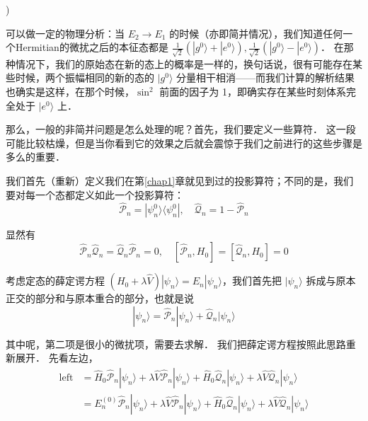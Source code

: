 )

可以做一定的物理分析：当 $E_2\to E_1$ 的时候（亦即简并情况），我们知道任何一个Hermitian的微扰之后的本征态都是 $\frac{1}{\sqrt{2}}(|g^0\rangle + |e^0\rangle),\frac{1}{\sqrt{2}}(|g^0\rangle - |e^0\rangle)$． 在那种情况下，我们的原始态在新的态上的概率是一样的，换句话说，很有可能存在某些时候，两个振幅相同的新的态的 $|g^0\rangle$ 分量相干相消——而我们计算的解析结果也确实是这样，在那个时候，$\sin^2$ 前面的因子为 1，即确实存在某些时刻体系完全处于 $|e^0\rangle$ 上．


那么，一般的非简并问题是怎么处理的呢？首先，我们要定义一些算符． 这一段可能比较枯燥，但是当你看到它的效果之后就会震惊于我们之前进行的这些步骤是多么的重要．

我们首先（重新）定义我们在第\ref{chap1}章就见到过的投影算符；不同的是，我们要对每一个态都定义如此一个投影算符：
\begin{equation}
\hat{\mathcal{P}}_n = |\psi^0_n\rangle\langle\psi^0_n|,\quad \hat{\mathcal{Q}}_n = 1-\hat{\mathcal{P}}_n 
\end{equation}

显然有
\begin{equation}
\hat{\mathcal{P}}_n \hat{\mathcal{Q}}_n = \hat{\mathcal{Q}}_n \hat{\mathcal{P}}_n =0,\quad [\hat{\mathcal{P}}_n ,H_0] = [\hat{\mathcal{Q}}_n ,H_0] = 0
\end{equation}

考虑定态的薛定谔方程 $(H_0+\lambda \hat{V})|\psi_n\rangle = E_n|\psi_n\rangle$，我们首先把 $|\psi_n\rangle$ 拆成与原本正交的部分和与原本重合的部分，也就是说
\begin{equation}
|\psi_n\rangle = \hat{\mathcal{P}}_n|\psi_n\rangle + \hat{\mathcal{Q}}_n|\psi_n\rangle
\end{equation}

其中呢，第二项是很小的微扰项，需要去求解． 我们把薛定谔方程按照此思路重新展开． 先看左边，
\begin{equation}
\begin{split}
\text{left} &= \hat{H}_0\hat{\mathcal{P}}_n|\psi_n\rangle + \lambda \hat{V}\hat{\mathcal{P}}_n|\psi_n\rangle + \hat{H}_0\hat{\mathcal{Q}}_n|\psi_n\rangle + \lambda \hat{V}\hat{\mathcal{Q}}_n|\psi_n\rangle\\
&=E_n^{(0)}\hat{\mathcal{P}}_n|\psi_n\rangle + \lambda \hat{V}\hat{\mathcal{P}}_n|\psi_n\rangle + \hat{H}_0\hat{\mathcal{Q}}_n|\psi_n\rangle + \lambda \hat{V}\hat{\mathcal{Q}}_n|\psi_n\rangle
\end{split}
\end{equation}

